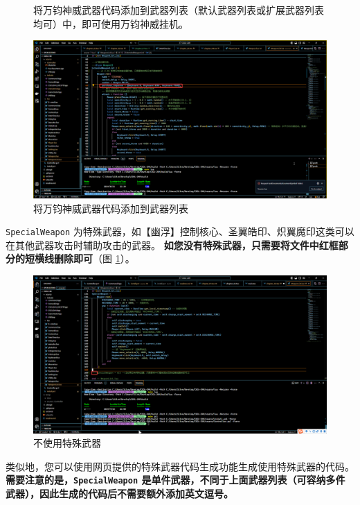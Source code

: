 \begin{figure}
    \Centering
    \parbox[l]{\textwidth}{将万钧神威武器代码添加到武器列表（默认武器列表或扩展武器列表均可）中，即可使用万钧神威挂机。}
    \includegraphics[width=\textwidth]{docs/assets/brionac.png}
    \caption{将万钧神威武器代码添加到武器列表}
\end{figure}

\lstinline{SpecialWeapon} 为特殊武器，如【幽浮】控制核心、圣翼皓印、炽翼魔印这类可以在其他武器攻击时辅助攻击的武器。\textbf{\color{red} 如您没有特殊武器，只需要将文件中红框部分的短横线删除即可}（图 \ref{ch2fig-delete-special-weapon}）。

\begin{figure}
    \Centering
    \includegraphics[width=\textwidth]{docs/assets/delete_SpecialWeapon.png}
    \caption{不使用特殊武器}
    \label{ch2fig-delete-special-weapon}
\end{figure}

类似地，您可以使用网页提供的特殊武器代码生成功能生成使用特殊武器的代码。\textbf{\color{red}需要注意的是，\lstinline{SpecialWeapon} 是单件武器，不同于上面武器列表（可容纳多件武器），因此生成的代码后不需要额外添加英文逗号。}

